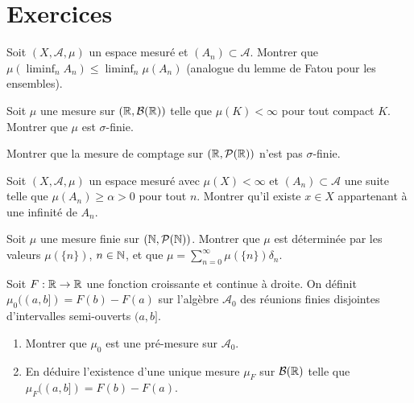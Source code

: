 \section{Exercices}

\begin{exercice}
Soit $(X, \mathcal{A}, \mu)$ un espace mesur\'e et $(A_n) \subset \mathcal{A}$.
Montrer que
$\mu(\liminf_n A_n) \leq \liminf_n \mu(A_n)$
(analogue du lemme de Fatou pour les ensembles).
\end{exercice}

\begin{exercice}
Soit $\mu$ une mesure sur $(\mathbb{R}, \mathcal{B}(\mathbb{R}))$ telle que $\mu(K) < \infty$ pour
tout compact $K$. Montrer que $\mu$ est $\sigma$-finie.
\end{exercice}

\begin{exercice}
Montrer que la mesure de comptage sur $(\mathbb{R}, \mathcal{P}(\mathbb{R}))$ n'est pas $\sigma$-finie.
\end{exercice}

\begin{exercice}
Soit $(X, \mathcal{A}, \mu)$ un espace mesur\'e avec $\mu(X) < \infty$ et
$(A_n) \subset \mathcal{A}$ une suite telle que
$\mu(A_n) \geq \alpha > 0$ pour tout $n$. Montrer qu'il existe $x \in X$
appartenant \`a une infinit\'e de $A_n$.
\end{exercice}

\begin{exercice}
Soit $\mu$ une mesure finie sur $(\mathbb{N}, \mathcal{P}(\mathbb{N}))$. Montrer que $\mu$ est
d\'etermin\'ee par les valeurs $\mu(\{n\})$, $n \in \mathbb{N}$, et que
$\mu = \sum_{n=0}^{\infty} \mu(\{n\}) \delta_n$.
\end{exercice}

\begin{exercice}
Soit $F : \mathbb{R} \to \mathbb{R}$ une fonction croissante et continue \`a droite. On d\'efinit
$\mu_0((a, b]) = F(b) - F(a)$ sur l'alg\`ebre $\mathcal{A}_0$ des r\'eunions finies
disjointes d'intervalles semi-ouverts $(a, b]$.
\begin{enumerate}
    \item Montrer que $\mu_0$ est une pr\'e-mesure sur $\mathcal{A}_0$.
    \item En d\'eduire l'existence d'une unique mesure $\mu_F$ sur
    $\mathcal{B}(\mathbb{R})$ telle que $\mu_F((a, b]) = F(b) - F(a)$.
\end{enumerate}
\end{exercice}
